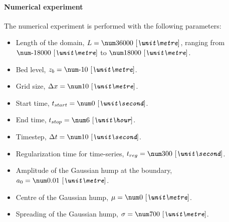 \paragraph*{Numerical experiment}
The numerical experiment is performed with the following parameters:
\begin{itemize}
    \item Length of the domain, $L = \bqty{36000}{\metre}$, ranging from $\bqty{-18000}{\metre}$ to $\bqty{18000}{\metre}$.
    \item Bed level, $z_b = \bqty{-10}{\metre}$.
    \item Grid size, $\Dx = \bqty{10}{\metre}$.
    \item Start time, $t_{start} = \bqty{0}{\second}$.
    \item End time, $t_{stop} = \bqty{6}{\hour}$.
    \item Timestep, $\Dt = \bqty{10}{\second}$.
    \item Regularization time for time-series, $t_{reg} = \bqty{300}{\second}$.
    \item Amplitude of the Gaussian hump at the boundary, $a_0 = \bqty{0.01}{\metre}$.
    \item Centre of the Gaussian hump, $\mu = \bqty{0}{\metre}$.
    \item Spreading of the Gaussian hump, $\sigma = \bqty{700}{\metre}$.
\end{itemize}
